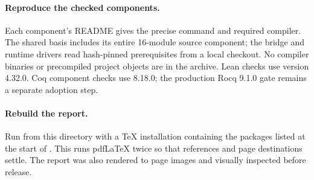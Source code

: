 \paragraph{Reproduce the checked components.}
Each component's README gives the precise command and required compiler.
The shared basis includes its entire 16-module source component; the bridge
and runtime drivers read hash-pinned prerequisites from a local checkout.
No compiler binaries or precompiled project objects are in the archive.
Lean checks use version 4.32.0. Coq component checks use 8.18.0; the production
Rocq 9.1.0 gate remains a separate adoption step.

\paragraph{Rebuild the report.}
Run  from this directory with a \TeX{} installation containing
the packages listed at the start of . This runs pdf\LaTeX{}
twice so that references and page destinations settle. The report was also
rendered to page images and visually inspected before release.
